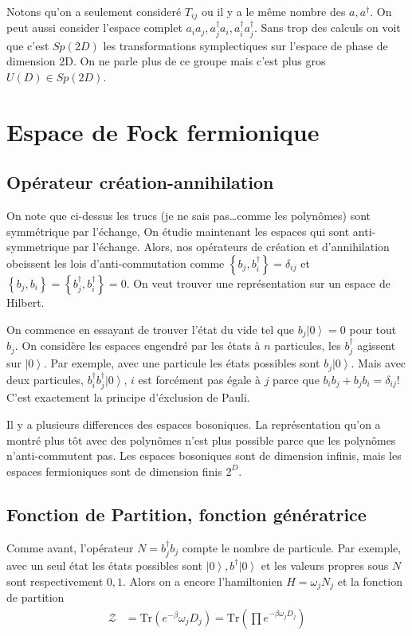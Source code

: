 \documentclass[10pt]{report}
\newcommand{\ket}[1]{\left|#1\right>}
\begin{document}
Notons qu'on a seulement consider\'e $T_{ij}$ ou il y a le m\^eme nombre des $a, a^\dagger$. On peut aussi consider l'espace complet $a_ia_j, a_j^\dagger a_i, a_i^\dagger a_j^\dagger$. Sans trop des calculs on voit que c'est $Sp(2D)$ les transformations symplectiques sur l'espace de phase de dimension 2D. On ne parle plus de ce groupe mais c'est plus gros $U(D) \in Sp(2D)$. 

\section{Espace de Fock fermionique}

\subsection{Op\'erateur cr\'eation-annihilation}

On note que ci-dessus les trucs (je ne sais pas\dots comme les polyn\^omes) sont symm\'etrique par l'\'echange, On \'etudie maintenant les espaces qui sont anti-symmetrique par l'\'echange. Alors, nos op\'erateurs de cr\'eation et d'annihilation obeissent les lois d'anti-commutation comme $\left\{ b_j, b_i^\dagger \right\} = \delta_{ij}$ et $\left\{ b_j, b_i \right\} = \left\{ b_j^\dagger, b_i^\dagger \right\} = 0$. On veut trouver une repr\'esentation sur un espace de Hilbert. 

On commence en essayant de trouver l'\'etat du vide tel que $b_j\ket{0} = 0$ pour tout $b_j$. On consid\`ere les espaces engendr\'e par les \'etats \`a $n$ particules, les $b_j^\dagger$ agissent sur $\ket{0}$. Par exemple, avec une particule les \'etats possibles sont $b_j\ket{0}$. Mais avec deux particules, $b_i^\dagger b_j^\dagger \ket{0}$, $i$ est forc\'ement pas \'egale \`a $j$ parce que $b_ib_j + b_jb_i  = \delta_{ij}$! C'est exactement la principe d'\'exclusion de Pauli. 

Il y a plusieurs differences des espaces bosoniques. La repr\'esentation qu'on a montr\'e plus t\^ot avec des polyn\^omes n'est plus possible parce que les polyn\^omes n'anti-commutent pas. Les espaces bosoniques sont de dimension infinis, mais les espaces fermioniques sont de dimension finis $2^D$. 

\subsection{Fonction de Partition, fonction g\'en\'eratrice}

Comme avant, l'op\'erateur $N = b_j^\dagger b_j$ compte le nombre de particule. Par exemple, avec un seul \'etat les \'etats possibles sont $\ket{0}, b^\dagger\ket{0}$ et les valeurs propres sous $N$ sont respectivement $0,1$. Alors on a encore l'hamiltonien $H = \omega_j N_j$ et la fonction de partition
\begin{align}
    \mathcal{Z} &= \mathrm{Tr}\left( e^{-\beta}\omega_jD_j \right) = \mathrm{Tr}\left( \prod e^{-\beta \omega_j D_j} \right)
\end{align}
\end{document}
